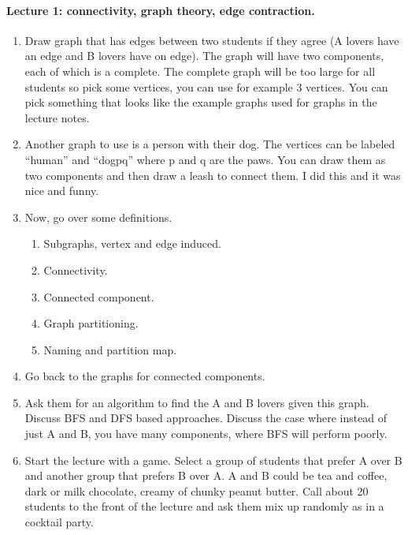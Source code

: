 
\begin{notesonly}

\paragraph{Lecture 1: connectivity, graph theory, edge contraction.} 
\begin{enumerate}

\item
Draw graph that has edges between two
students if they agree (A lovers have an edge and B lovers have on
edge).  The graph will have two components, each of which is a
complete.  The complete graph will be too large for all students so
pick some vertices, you can use for example 3 vertices. You can pick
something that looks like the example graphs used for graphs in the
lecture notes.

\item Another graph to use is a person with their dog.  The vertices
  can be labeled ``human'' and ``dogpq'' where p and q are the paws.
  You can draw them as two  components and then draw a leash to
  connect them.  I did this and it was nice and funny.

\item Now, go over some definitions.
\begin{enumerate}

\item Subgraphs, vertex and edge induced.

\item Connectivity. 

\item Connected component.

\item Graph partitioning. 

\item Naming and partition map.
\end{enumerate}

\item Go back to the graphs for connected components.

\item Ask them for an algorithm to find the A and B lovers given
  this graph.  Discuss BFS and DFS based approaches.  Discuss the case
  where instead of just A and B, you have many components, where BFS
  will perform poorly.



\item 
Start the lecture with a game. Select a group of students that prefer
A over B and another group that prefers B over A.
%
A and B could be tea and coffee, dark or milk chocolate, creamy of
chunky peanut butter. 
%
Call about 20 students to the front of the lecture and ask them mix up
randomly as in a cocktail party.


\end{enumerate}
\end{notesonly}
